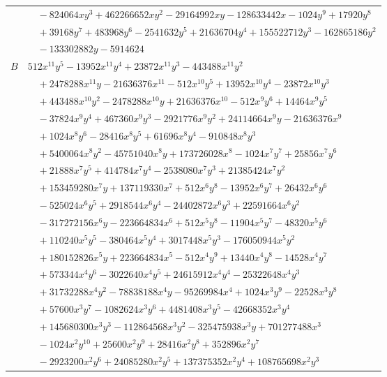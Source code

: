 \documentclass[11pt]{article}
\begin{document}
\begin{longtable}{@{}ll@{}}
 & $\quad -824064xy^{3}+462266652xy^{2}-29164992xy-128633442x-1024y^{9}+17920y^{8}$\\
 & $\quad +39168y^{7}+483968y^{6}-2541632y^{5}+21636704y^{4}+155522712y^{3}-162865186y^{2}$\\
 & $\quad -133302882y-5914624$\\
$B$ & $512x^{11}y^{5}-13952x^{11}y^{4}+23872x^{11}y^{3}-443488x^{11}y^{2}$\\
 & $\quad +2478288x^{11}y-21636376x^{11}-512x^{10}y^{5}+13952x^{10}y^{4}-23872x^{10}y^{3}$\\
 & $\quad +443488x^{10}y^{2}-2478288x^{10}y+21636376x^{10}-512x^{9}y^{6}+14464x^{9}y^{5}$\\
 & $\quad -37824x^{9}y^{4}+467360x^{9}y^{3}-2921776x^{9}y^{2}+24114664x^{9}y-21636376x^{9}$\\
 & $\quad +1024x^{8}y^{6}-28416x^{8}y^{5}+61696x^{8}y^{4}-910848x^{8}y^{3}$\\
 & $\quad +5400064x^{8}y^{2}-45751040x^{8}y+173726028x^{8}-1024x^{7}y^{7}+25856x^{7}y^{6}$\\
 & $\quad +21888x^{7}y^{5}+414784x^{7}y^{4}-2538080x^{7}y^{3}+21385424x^{7}y^{2}$\\
 & $\quad +153459280x^{7}y+137119330x^{7}+512x^{6}y^{8}-13952x^{6}y^{7}+26432x^{6}y^{6}$\\
 & $\quad -525024x^{6}y^{5}+2918544x^{6}y^{4}-24402872x^{6}y^{3}+22591664x^{6}y^{2}$\\
 & $\quad -317272156x^{6}y-223664834x^{6}+512x^{5}y^{8}-11904x^{5}y^{7}-48320x^{5}y^{6}$\\
 & $\quad +110240x^{5}y^{5}-380464x^{5}y^{4}+3017448x^{5}y^{3}-176050944x^{5}y^{2}$\\
 & $\quad +180152826x^{5}y+223664834x^{5}-512x^{4}y^{9}+13440x^{4}y^{8}-14528x^{4}y^{7}$\\
 & $\quad +573344x^{4}y^{6}-3022640x^{4}y^{5}+24615912x^{4}y^{4}-25322648x^{4}y^{3}$\\
 & $\quad +31732288x^{4}y^{2}-78838188x^{4}y-95269984x^{4}+1024x^{3}y^{9}-22528x^{3}y^{8}$\\
 & $\quad +57600x^{3}y^{7}-1082624x^{3}y^{6}+4481408x^{3}y^{5}-42668352x^{3}y^{4}$\\
 & $\quad +145680300x^{3}y^{3}-112864568x^{3}y^{2}-325475938x^{3}y+701277488x^{3}$\\
 & $\quad -1024x^{2}y^{10}+25600x^{2}y^{9}+28416x^{2}y^{8}+352896x^{2}y^{7}$\\
 & $\quad -2923200x^{2}y^{6}+24085280x^{2}y^{5}+137375352x^{2}y^{4}+108765698x^{2}y^{3}$\\

\end{longtable}
\end{document}
